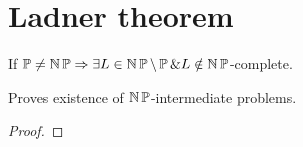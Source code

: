\section{\texorpdfstring{Ladner theorem}{Ladner theorem}}
\vspace{5mm}
\large

\begin{theorem}[Ladner]
	If $\TP \ne \TNP \Rightarrow \exists L \in \TNP \setminus \TP \& L \notin \TNP$-complete.

	Proves existence of $\TNP$-intermediate problems.
\end{theorem}
\begin{proof}
\end{proof}
